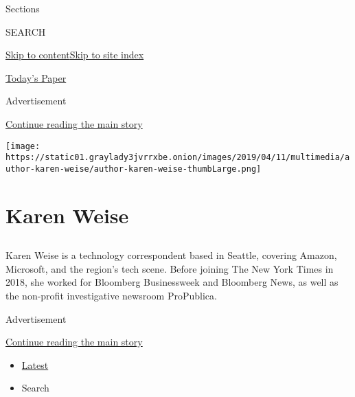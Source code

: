 Sections

SEARCH

\protect\hyperlink{site-content}{Skip to
content}\protect\hyperlink{site-index}{Skip to site index}

\href{https://myaccount.nytimes3xbfgragh.onion/auth/login?response_type=cookie\&client_id=vi}{}

\href{https://www.nytimes3xbfgragh.onion/section/todayspaper}{Today's
Paper}

Advertisement

\protect\hyperlink{after-top}{Continue reading the main story}

\texttt{[image: https://static01.graylady3jvrrxbe.onion/images/2019/04/11/multimedia/author-karen-weise/author-karen-weise-thumbLarge.png]}

\hypertarget{karen-weise}{%
\section{Karen Weise}\label{karen-weise}}

\hypertarget{section}{%
\subsection{}\label{section}}

Karen Weise is a technology correspondent based in Seattle, covering
Amazon, Microsoft, and the region's tech scene. Before joining The New
York Times in 2018, she worked for Bloomberg Businessweek and Bloomberg
News, as well as the non-profit investigative newsroom ProPublica.

Advertisement

\protect\hyperlink{after-mid1}{Continue reading the main story}

\begin{itemize}
\tightlist
\item
  \protect\hyperlink{stream-panel}{Latest}
\item
  Search
\end{itemize}

